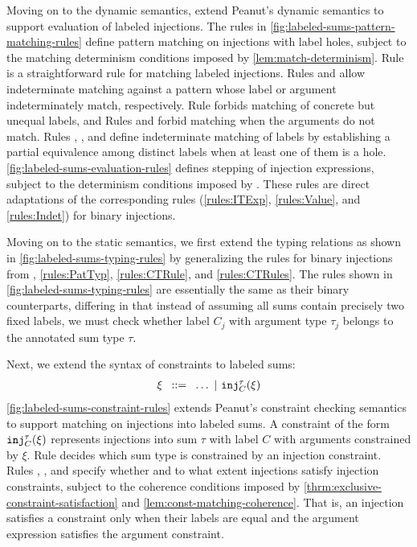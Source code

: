  Moving on to the
dynamic semantics,
extend Peanut's dynamic semantics to support evaluation of labeled
injections.  The rules in
\autoref{fig:labeled-sums-pattern-matching-rules} define pattern
matching on injections with label holes, subject to the matching
determinism conditions imposed by \autoref{lem:match-determinism}.
Rule \MInj is a straightforward rule for matching labeled injections.
Rules \MMInjTag and \MMInjArg allow indeterminate matching against a
pattern whose label or argument indeterminately match, respectively.
Rule \NMInj forbids matching of concrete but unequal labels, and Rules
\NMInjTag and \NMInjArg forbid matching when the arguments do not
match.  Rules \TMMSym, \TMMHole, and \TMMEHole define indeterminate
matching of labels by establishing a partial equivalence among
distinct labels when at least one of them is a hole.
\autoref{fig:labeled-sums-evaluation-rules} defines stepping of
injection expressions, subject to the determinism conditions imposed
by .
These rules are direct adaptations of the corresponding rules (\ref{rules:ITExp}, \ref{rules:Value}, and
\ref{rules:Indet}) for
binary injections.




Moving on to the static semantics, we first extend the typing relations as shown in \autoref{fig:labeled-sums-typing-rules}
by generalizing the rules for binary injections from , \ref{rules:PatTyp}, \ref{rules:CTRule}, and \ref{rules:CTRules}.
The rules shown in \autoref{fig:labeled-sums-typing-rules} are essentially the same as their binary counterparts,
differing in that instead of assuming all sums contain precisely two fixed labels,
we must check whether label $C_j$ with argument type $\tau_j$ belongs to the annotated sum type $\tau$.


Next, we extend the syntax of constraints to labeled sums:
\[
  \arraycolsep=4pt\begin{array}{lll}
    \xi & ::= & \ldots ~\vert~ \cinj{C}{\tau}{\xi}
  \end{array}
\]
\autoref{fig:labeled-sums-constraint-rules} extends Peanut's constraint checking semantics to support matching on injections into labeled sums.
A constraint of the form $\mathtt{inj}_{C}^{\tau}(\xi)$ represents injections into sum $\tau$ with label $C$ with arguments constrained by $\xi$.
Rule \CTInj decides which sum type is constrained by an injection constraint.
Rules \CSInj, \CMSInjTag, and \CMSInjArg specify whether and to what extent injections satisfy injection constraints,
subject to the coherence conditions imposed by \autoref{thrm:exclusive-constraint-satisfaction} and \autoref{lem:const-matching-coherence}.
That is, an injection satisfies a constraint only when their labels are equal and the argument expression satisfies the argument constraint.

